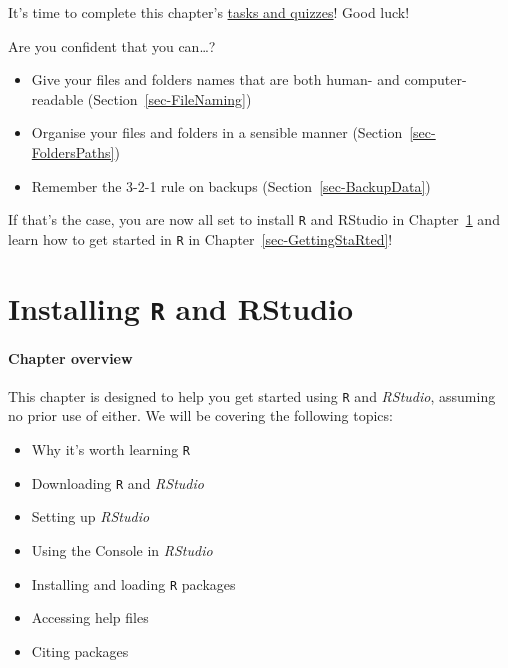 \documentclass[
  letterpaper,
  DIV=11,
  numbers=noendperiod]{scrreprt}
\providecommand{\tightlist}{%
  \setlength{\itemsep}{0pt}\setlength{\parskip}{0pt}}
\begin{document}
It's time to complete this chapter's
\href{https://elenlefoll.github.io/RstatsTextbook/quizzes/3_quiz.html}{tasks
and quizzes}! Good luck! 

Are you confident that you can\ldots?

\begin{itemize}
\tightlist
\item[$\square$]
  Give your files and folders names that are both human- and
  computer-readable (Section~\ref{sec-FileNaming})
\item[$\square$]
  Organise your files and folders in a sensible manner
  (Section~\ref{sec-FoldersPaths})
\item[$\square$]
  Remember the 3-2-1 rule on backups (Section~\ref{sec-BackupData})
\end{itemize}

If that's the case, you are now all set to install \texttt{R} and
RStudio in Chapter~\ref{sec-Installing} and learn how to get started in
\texttt{R} in Chapter~\ref{sec-GettingStaRted}!


\chapter{\texorpdfstring{Installing \texttt{R} and
RStudio}{Installing R and RStudio}}\label{sec-Installing}

\subsubsection*{\texorpdfstring{\textbf{Chapter
overview}}{Chapter overview}}\label{chapter-overview-3}

This chapter is designed to help you get started using \texttt{R} and
\emph{RStudio}, assuming no prior use of either. We will be covering the
following topics:

\begin{itemize}
\tightlist
\item
  Why it's worth learning \texttt{R}
\item
  Downloading \texttt{R} and \emph{RStudio}
\item
  Setting up \emph{RStudio}
\item
  Using the Console in \emph{RStudio}
\item
  Installing and loading \texttt{R} packages
\item
  Accessing help files
\item
  Citing packages
\end{itemize}
\end{document}
